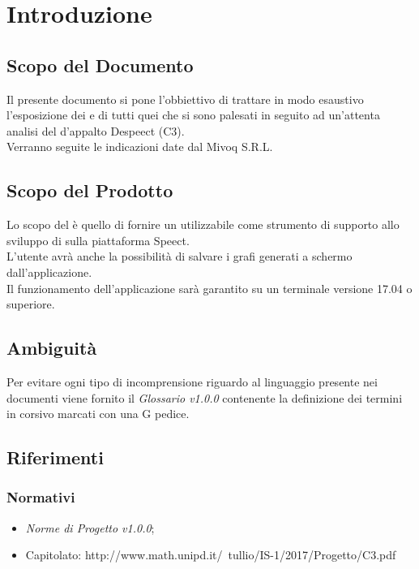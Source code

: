 \documentclass[./AnalisideiRequisiti.tex]{subfiles}
\begin{document}
	
\chapter{Introduzione}
\section{Scopo del Documento}
Il presente documento si pone l’obbiettivo di trattare in modo esaustivo l’esposizione dei  e di tutti quei  che si sono palesati in seguito ad un’attenta analisi del  d’appalto Despeect (C3).
\\ \noindent Verranno seguite le indicazioni date dal  Mivoq S.R.L.

\section{Scopo del Prodotto}

Lo scopo del  è quello di fornire un  utilizzabile come strumento di supporto allo sviluppo di  sulla piattaforma Speect. 
\\ \noindent L'utente avrà anche la possibilità di salvare i grafi generati a schermo dall'applicazione.
\\ \noindent Il funzionamento dell'applicazione sarà garantito su un terminale  versione 17.04 o superiore.

\section{Ambiguità}
Per evitare ogni tipo di incomprensione riguardo al linguaggio presente nei documenti viene fornito il \textit{Glossario v1.0.0} contenente la definizione dei termini in corsivo marcati con una G pedice.

\section{Riferimenti}
\subsection{Normativi}
\begin{itemize}
	\item \textit{Norme di Progetto v1.0.0};
	\item Capitolato: http://www.math.unipd.it/~tullio/IS-1/2017/Progetto/C3.pdf
\end{itemize}
\end{document}
